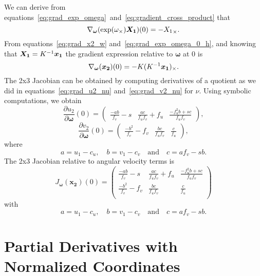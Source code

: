We can derive from equations~\ref{eq:grad_exp_omega}~and~\ref{eq:gradient_cross_product} that
\begin{equation}
\label{eq:grad_exp_omega_0_h}
	\nabla_{\bm{\omega}} (\exp({\omega}_{\times}) \bm{X_1} )(0)
	= -{X_1}_{\times}.
\end{equation}
From equations~\ref{eq:grad_x2_w} and~\ref{eq:grad_exp_omega_0_h},
and knowing that $\bm{X_1} = K^{-1} \bm{x_1}$
the gradient expression relative to $\bm{\omega}$ at 0 is
\begin{equation}
\label{eq:grad_x2_omega_0}
	\nabla_{\bm{\omega}}(\bm{x_2})(0)
		= -K (K^{-1}\bm{x_1})_{\times}.
\end{equation}
The 2x3 Jacobian can be obtained by computing derivatives of a quotient
as we did in equations~\ref{eq:grad_u2_nu} and~\ref{eq:grad_v2_nu} for $\nu$.
Using symbolic computations, we obtain
\begin{equation}
\label{eq:grad_u2_omega}
	\frac{\partial u_2}{\partial \bm{\omega}}(0)
	= \begin{pmatrix}
		\frac{-ab}{f_v} - s
			& \frac{a c}{f_u f_v} + f_u
			& \frac{-f_u^2 b + s c}{f_u f_v}
	\end{pmatrix},
\end{equation}
\begin{equation}
\label{eq:grad_v2_omega}
	\frac{\partial v_2}{\partial \bm{\omega}}(0)
	= \begin{pmatrix}
		\frac{-b^2}{f_v} - f_v
			& \frac{b c}{f_u f_v}
			& \frac{c}{f_u}
	\end{pmatrix},
\end{equation}
where
\[
	a = u_1 - c_u, \quad b = v_1 - c_v
	\quad \textrm{and} \quad c = a f_v - s b.
\]
The 2x3 Jacobian relative to angular velocity terms is
\begin{equation}
\label{eq:jac_2x3_omega}
	\boxed{J_{\bm{\omega}}(\bm{x_2})(0) =
		\begin{pmatrix}
			\frac{-ab}{f_v} - s
				& \frac{a c}{f_u f_v} + f_u
				& \frac{-f_u^2 b + s c}{f_u f_v} \\
			\frac{-b^2}{f_v} - f_v
				& \frac{b c}{f_u f_v}
				& \frac{c}{f_u} \\
		\end{pmatrix}}
\end{equation}
with
\[
	a = u_1 - c_u, \quad b = v_1 - c_v
	\quad \textrm{and} \quad c = a f_v - s b.
\]

\section{Partial Derivatives with Normalized Coordinates}%
\label{sec:partial_derivatives_normalized}

